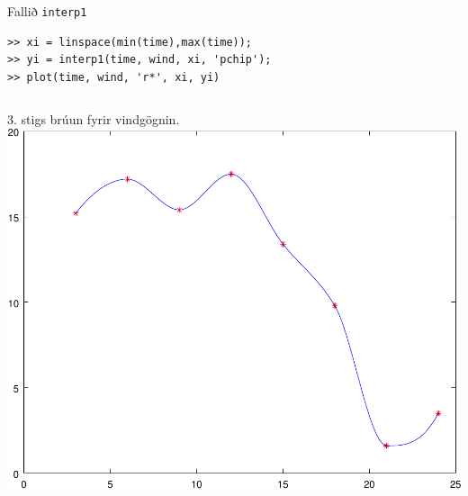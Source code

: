 \documentclass[handout]{beamer}
\begin{document}
\begin{frame}[fragile]{Fallið \texttt{interp1}}
\vspace{1cm}
\begin{verbatim}
>> xi = linspace(min(time),max(time));
>> yi = interp1(time, wind, xi, 'pchip');
>> plot(time, wind, 'r*', xi, yi)
\end{verbatim}
\begin{columns}
3. stigs brúun fyrir vindgögnin.
\includegraphics[width=\linewidth]{Pics/interp1-plot}
\end{columns}
\end{frame}
\end{document}
